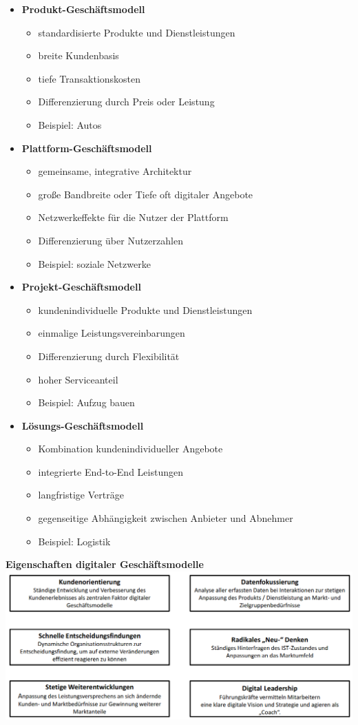 \documentclass[a4]{scrartcl}
\begin{document}
\begin{itemize}
\item \textbf{Produkt-Geschäftsmodell}
\begin{itemize}
\item standardisierte Produkte und Dienstleistungen
\item breite Kundenbasis
\item tiefe Transaktionskosten
\item Differenzierung durch Preis oder Leistung
\item Beispiel: Autos
\end{itemize}
\item \textbf{Plattform-Geschäftsmodell}
\begin{itemize}
\item gemeinsame, integrative Architektur 
\item große Bandbreite oder Tiefe oft digitaler Angebote
\item Netzwerkeffekte für die Nutzer der Plattform
\item Differenzierung über Nutzerzahlen
\item Beispiel: soziale Netzwerke
\end{itemize}
\item \textbf{Projekt-Geschäftsmodell}
\begin{itemize}
\item kundenindividuelle Produkte und Dienstleistungen
\item einmalige Leistungsvereinbarungen
\item Differenzierung durch Flexibilität
\item hoher Serviceanteil
\item Beispiel: Aufzug bauen
\end{itemize}
\item \textbf{Lösungs-Geschäftsmodell}
\begin{itemize}
\item Kombination kundenindividueller Angebote
\item integrierte End-to-End Leistungen
\item langfristige Verträge
\item gegenseitige Abhängigkeit zwischen Anbieter und Abnehmer
\item Beispiel: Logistik
\end{itemize}
\end{itemize}

\newpage

\textbf{Eigenschaften digitaler Geschäftsmodelle} \\
\includegraphics[scale=0.33]{edg.png} \\
\end{document}
